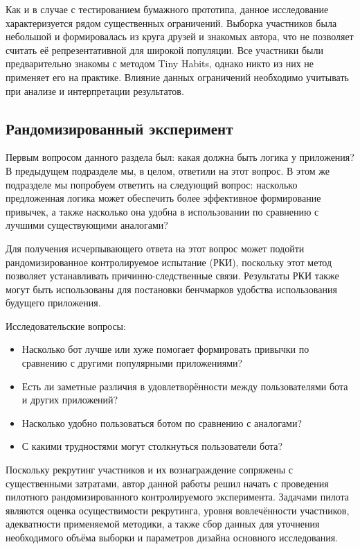 \documentclass[pdflatex,sn-mathphys-num]{sn-jnl}%
\theoremstyle{thmstyleone}%
\theoremstyle{thmstyletwo}%
\theoremstyle{thmstylethree}%
\begin{document}
Как и в случае с тестированием бумажного прототипа, данное исследование характеризуется рядом существенных ограничений. Выборка участников была небольшой и формировалась из круга друзей и знакомых автора, что не позволяет считать её репрезентативной для широкой популяции. Все участники были предварительно знакомы с методом Tiny Habits, однако никто из них не применяет его на практике. Влияние данных ограничений необходимо учитывать при анализе и интерпретации результатов.

\subsection{Рандомизированный эксперимент}

Первым вопросом данного раздела был: какая должна быть логика у приложения? В предыдущем подразделе мы, в целом, ответили на этот вопрос. В этом же подразделе мы попробуем ответить на следующий вопрос: насколько предложенная логика может обеспечить более эффективное формирование привычек, а также насколько она удобна в использовании по сравнению с лучшими существующими аналогами?

Для получения исчерпывающего ответа на этот вопрос может подойти рандомизированное контролируемое испытание (РКИ), поскольку этот метод позволяет устанавливать причинно-следственные связи. Результаты РКИ также могут быть использованы для постановки бенчмарков удобства использования будущего приложения.

Исследовательские вопросы:

\begin{itemize}
    \item Насколько бот лучше или хуже помогает формировать привычки по сравнению с другими популярными приложениями?
    \item Есть ли заметные различия в удовлетворённости между пользователями бота и других приложений?
    \item Насколько удобно пользоваться ботом по сравнению с аналогами?
    \item С какими трудностями могут столкнуться пользователи бота?
\end{itemize}

Поскольку рекрутинг участников и их вознаграждение сопряжены с существенными затратами, автор данной работы решил начать с проведения пилотного рандомизированного контролируемого эксперимента. Задачами пилота являются оценка осуществимости рекрутинга, уровня вовлечённости участников, адекватности применяемой методики, а также сбор данных для уточнения необходимого объёма выборки и параметров дизайна основного исследования.
\end{document}
